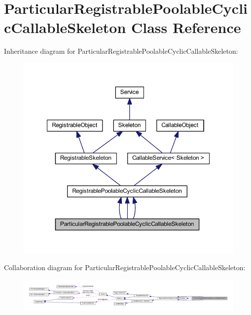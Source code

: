 \hypertarget{class_particular_registrable_poolable_cyclic_callable_skeleton}{
\section{ParticularRegistrablePoolableCyclicCallableSkeleton Class Reference}
\label{class_particular_registrable_poolable_cyclic_callable_skeleton}
}


Inheritance diagram for ParticularRegistrablePoolableCyclicCallableSkeleton:\nopagebreak
\begin{figure}[H]
\begin{center}
\leavevmode
\includegraphics[width=355pt]{class_particular_registrable_poolable_cyclic_callable_skeleton__inherit__graph}
\end{center}
\end{figure}


Collaboration diagram for ParticularRegistrablePoolableCyclicCallableSkeleton:\nopagebreak
\begin{figure}[H]
\begin{center}
\leavevmode
\includegraphics[width=400pt]{class_particular_registrable_poolable_cyclic_callable_skeleton__coll__graph}
\end{center}
\end{figure}
